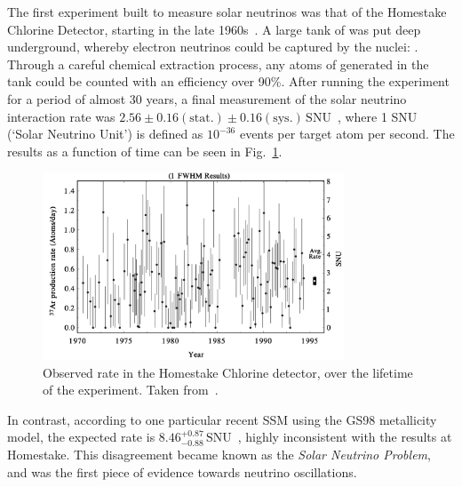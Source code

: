 The first experiment built to measure solar neutrinos was that of the Homestake Chlorine Detector, starting in the late 1960s~\cite{davisSearchNeutrinosSun1968}. A large tank of  was put deep underground, whereby electron neutrinos could be captured by the  nuclei: . Through a careful chemical extraction process, any atoms of  generated in the tank could be counted with an efficiency over 90\%. After running the experiment for a period of almost 30 years, a final measurement of the solar neutrino interaction rate was $2.56\pm0.16(\mathrm{stat.})\pm0.16(\mathrm{sys.})\,\mathrm{ SNU}$~\cite{clevelandMeasurementSolarElectron1998}, %
where 1 SNU (`Solar Neutrino Unit') is defined as $10^{-36}$ events per target atom per second. The results as a function of time can be seen in Fig.~\ref{fig:homestake_results}.

\begin{figure}
    \centering
    \includegraphics[width=0.8\textwidth]{1_NeutrinoTheory/Figs/homestake_summary_results.png}
    \caption[]{Observed rate in the Homestake Chlorine detector, over the lifetime of the experiment. Taken from~\cite{clevelandMeasurementSolarElectron1998}.}
    \label{fig:homestake_results}
\end{figure}

In contrast, according to one particular recent SSM using the GS98 metallicity model, the expected rate is $8.46^{+0.87}_{-0.88}\,\mathrm{ SNU}$~\cite{pena-garaySolarNeutrinosSolar2008}, highly inconsistent with the results at Homestake. This disagreement became known as the \textit{Solar Neutrino Problem}, and was the first piece of evidence towards neutrino oscillations.

